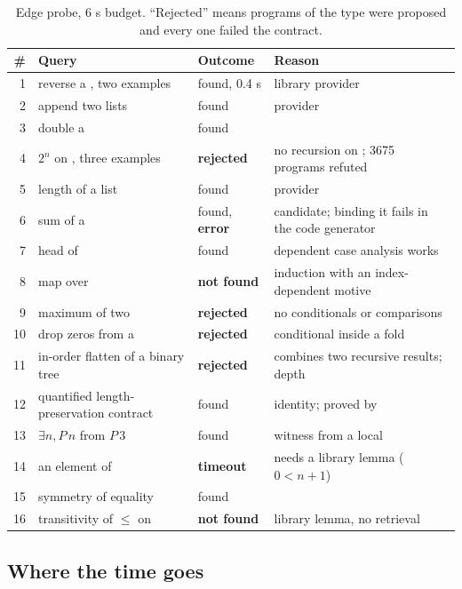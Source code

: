 \begin{table}[h]
\centering\small
\begin{tabular}{@{}rL{60mm}L{26mm}L{52mm}@{}}
\toprule
\# & Query & Outcome & Reason\\
 & reverse a , two examples & found, 0.4 s & library provider \\
2 & append two lists & found & provider\\
3 & double a  & found & \\
4 & $2^n$ on , three examples & \textbf{rejected} & no recursion on ; 3675 programs refuted\\
5 & length of a list & found & provider\\
6 & sum of a  & found, \textbf{error} &  candidate; binding it fails in the code generator\\
7 & head of  & found & dependent case analysis works\\
8 & map over  & \textbf{not found} & induction with an index-dependent motive\\
9 & maximum of two  & \textbf{rejected} & no conditionals or comparisons\\
10 & drop zeros from a  & \textbf{rejected} & conditional inside a fold\\
11 & in-order flatten of a binary tree & \textbf{rejected} & combines two recursive results; depth\\
12 & quantified length-preservation contract & found & identity; proved by \\
13 & $\exists n, P\,n$ from $P\,3$ & found & witness from a local\\
14 & an element of  & \textbf{timeout} & needs a library lemma ($0 < n+1$)\\
15 & symmetry of equality & found & \\
16 & transitivity of $\le$ on  & \textbf{not found} & library lemma, no retrieval\\
\bottomrule
\end{tabular}
\caption{Edge probe, 6 s budget. ``Rejected'' means programs of the type were proposed and every one failed the contract.}\label{tab:probe}
\end{table}

\subsection{Where the time goes}\label{sec:profile}

